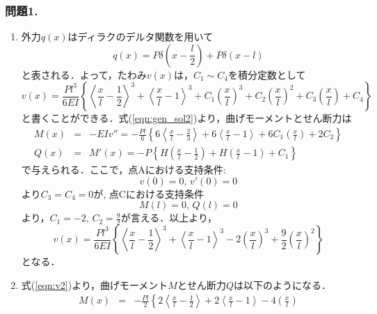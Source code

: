 \documentclass[10pt,a4j]{jarticle}
\begin{document}
\subsubsection*{問題1. }
\begin{enumerate}
\item
外力$q(x)$はディラクのデルタ関数を用いて
\begin{equation}
	q(x)=P\delta \left(x-\frac{l}{2} \right)
	+P\delta \left(x-l \right)
	\label{eqn:qx_dlt}
\end{equation}
と表される．よって，たわみ$v(x)$は，$C_1\sim C_4$を積分定数として
\begin{equation}
	v(x)=\frac{Pl^3}{6EI}\left\{
			\left< \frac{x}{l} -\frac{1}{2}\right>^3
			+
			\left< \frac{x}{l} -1\right>^3
			+
			C_1\left(\frac{x}{l}\right)^3
			+
			C_2\left(\frac{x}{l}\right)^2
			+
			C_3\left(\frac{x}{l}\right)
			+
			C_4
		\right\}
		\label{eqn:gen_sol2}
\end{equation}
と書くことができる．式(\ref{eqn:gen_sol2})より，曲げモーメントとせん断力は
\begin{eqnarray}
	M(x) &=& -EIv''=-\frac{Pl}{6}\left\{
			6\left< \frac{x}{l} -\frac{2}{3}\right>
			+
			6\left< \frac{x}{l} -1 \right>
			+			
			6C_1\left(\frac{x}{l}\right)
			+
			2C_2
		\right\} \\
	Q(x) &=& M'(x) =-P\left\{ 
		H\left( \frac{x}{l}-\frac{1}{2}\right)
		+
		H\left( \frac{x}{l}-1\right)
		+C_1
		\right\}
\end{eqnarray}
で与えられる．ここで，点Aにおける支持条件:
\begin{equation}
	v(0)=0,\, v'(0)=0
\end{equation}
より$C_3=C_4=0$が, 点Cにおける支持条件
\begin{equation}
	M(l)=0,\, Q(l)=0
\end{equation}
より，$C_1=-2, \, C_2=\frac{9}{2}$が言える．以上より，
\begin{equation}
	v(x)=\frac{Pl^3}{6EI}\left\{
			\left< \frac{x}{l} -\frac{1}{2}\right>^3
			+
			\left< \frac{x}{l} -1 \right>^3
			-
			2
			\left(\frac{x}{l}\right)^3
			+
			\frac{9}{2}\left( \frac{x}{l} \right)^2
			\right\}
	\label{eqn:v2}
\end{equation}
となる．
\item
式(\ref{eqn:v2})より，曲げモーメント$M$とせん断力$Q$は以下のようになる．
\begin{eqnarray}
	M(x) &=& 
		-\frac{Pl}{2}
			\left\{
				2\left< \frac{x}{l} - \frac{1}{2}\right> 
				+
				2\left< \frac{x}{l} - 1 \right> 
				-4\left(\frac{x}{l}\right)

\end{eqnarray}
\end{enumerate}
\end{document}
